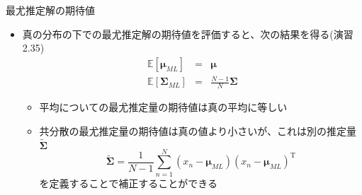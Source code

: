 \begin{frame}{最尤推定解の期待値}
 \begin{itemize}
  \item 真の分布の下での最尤推定解の期待値を評価すると、次の結果を得る(演習2.35)
        \begin{eqnarray}
         \mathbb{E}[\bm{\mu}_{ML}]&=&\bm{\mu}\\
         \mathbb{E}[\bm{\Sigma}_{ML}]&=&\frac{N-1}{N}\bm{\Sigma}
        \end{eqnarray}
        \begin{itemize}
         \item 平均についての最尤推定量の期待値は真の平均に等しい
         \item 共分散の最尤推定量の期待値は真の値より小さいが、これは別の推定量$\widetilde{\bm{\Sigma}}$
               \begin{equation}
                \widetilde{\bm{\Sigma}} = \frac{1}{N-1}\sum_{n=1}^{N}(x_n-\bm{\mu}_{ML})(x_n-\bm{\mu}_{ML})^{\mathrm{T}}
               \end{equation}
               を定義することで補正することができる
        \end{itemize}
 \end{itemize}
\end{frame}

